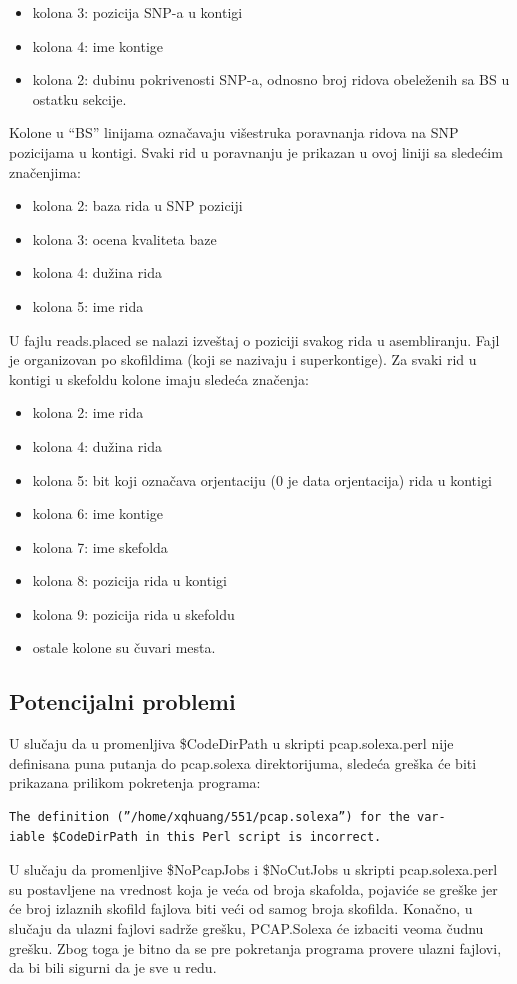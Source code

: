 \documentclass[a4paper]{article}
\begin{document}
{\begin{itemize}
  \item kolona 3:  pozicija SNP-a u kontigi
  \item kolona 4: ime kontige
  \item kolona 2: dubinu pokrivenosti SNP-a, odnosno broj ridova obeleženih sa BS u ostatku sekcije.
\end{itemize}
Kolone u ``BS'' linijama označavaju višestruka poravnanja ridova na SNP pozicijama u kontigi. Svaki rid u poravnanju je prikazan u ovoj liniji sa sledećim značenjima:
\begin{itemize}
  \item kolona 2: baza rida u SNP poziciji
  \item kolona 3: ocena kvaliteta baze
  \item kolona 4: dužina rida
  \item kolona 5: ime rida
\end{itemize}
\indent  U fajlu reads.placed se nalazi izveštaj o poziciji svakog rida u asembliranju. Fajl je organizovan po skofildima (koji se nazivaju i superkontige). Za svaki rid u kontigi u skefoldu kolone imaju sledeća značenja:
\begin{itemize}
  \item kolona 2: ime rida
  \item kolona 4: dužina rida
  \item kolona 5: bit koji označava orjentaciju (0 je data orjentacija) rida u kontigi
  \item kolona 6: ime kontige
  \item kolona 7: ime skefolda
  \item kolona 8: pozicija rida u kontigi
  \item kolona 9: pozicija rida u skefoldu
  \item ostale kolone su čuvari mesta.
\end{itemize}
\subsection{Potencijalni problemi}
\label{subsec:problemi}

U slučaju da u promenljiva \$CodeDirPath u skripti pcap.solexa.perl nije definisana puna putanja  do pcap.solexa direktorijuma, sledeća greška će biti prikazana prilikom pokretenja programa:
\begin{verbatim}
The definition (”/home/xqhuang/551/pcap.solexa”) for the var-
iable $CodeDirPath in this Perl script is incorrect.
\end{verbatim}
U slučaju da promenljive \$NoPcapJobs i \$NoCutJobs u skripti pcap.so\-lexa.perl su postavljene na vrednost koja je veća od broja skafolda, pojaviće se greške jer će broj izlaznih skofild fajlova biti veći od samog broja skofilda. Konačno, u slučaju da ulazni fajlovi sadrže grešku, PCAP.Solexa će izbaciti veoma čudnu grešku. Zbog toga je bitno da se pre pokretanja programa provere ulazni fajlovi, da bi bili sigurni da je sve u redu. 

}
\end{document}

